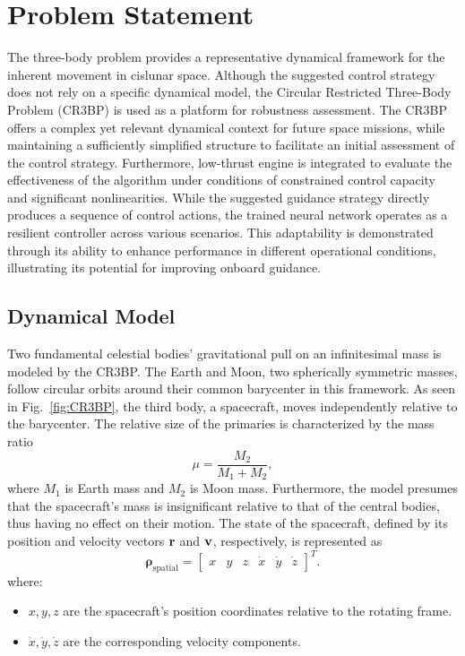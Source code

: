\documentclass[conference]{IEEEtran}
\begin{document}
\section{Problem Statement}
The three-body problem provides a representative dynamical framework for the inherent movement in cislunar space.
Although the suggested control strategy does not rely on a specific dynamical model, the Circular Restricted Three-Body Problem (CR3BP) is used as a platform for robustness assessment.
The CR3BP offers a complex yet relevant dynamical context for future space missions, while maintaining a sufficiently simplified structure to facilitate an initial assessment of the control strategy.
Furthermore, low-thrust engine is integrated to evaluate the effectiveness of the algorithm under conditions of constrained control capacity and significant nonlinearities.
While the suggested guidance strategy directly produces a sequence of control actions, the trained neural network operates as a resilient controller across various scenarios.
This adaptability is demonstrated through its ability to enhance performance in different operational conditions, illustrating its potential for improving onboard guidance.
\subsection{Dynamical Model}
Two fundamental celestial bodies' gravitational pull on an infinitesimal mass is modeled by the CR3BP. The Earth and Moon, two spherically symmetric masses, follow circular orbits around their common barycenter in this framework. As seen in Fig.~\ref{fig:CR3BP}, the third body, a spacecraft, moves independently relative to the barycenter. The relative size of the primaries is characterized by the mass ratio
\begin{equation}
	\mu = \frac{M_2}{M_1 + M_2},
\end{equation}
where \( M_1 \) is Earth mass and \( M_2 \) is Moon mass.
Furthermore, the model presumes that the spacecraft's mass is insignificant relative to that of the central bodies, thus having no effect on their motion.
The state of the spacecraft, defined by its position and velocity vectors \( \vb{r}\) and \( \vb{v}\), respectively, is represented as
\begin{equation}
	\boldsymbol{\rho}_{\text{spatial}} = \begin{bmatrix} x & y & z & \dot{x} & \dot{y} & \dot{z} \end{bmatrix}^T.
\end{equation}
where:
\begin{itemize}
    \item \(x, y, z\) are the spacecraft's position coordinates relative to the rotating frame.
    \item \(\dot{x}, \dot{y}, \dot{z}\) are the corresponding velocity components.
\end{itemize}
\end{document}
